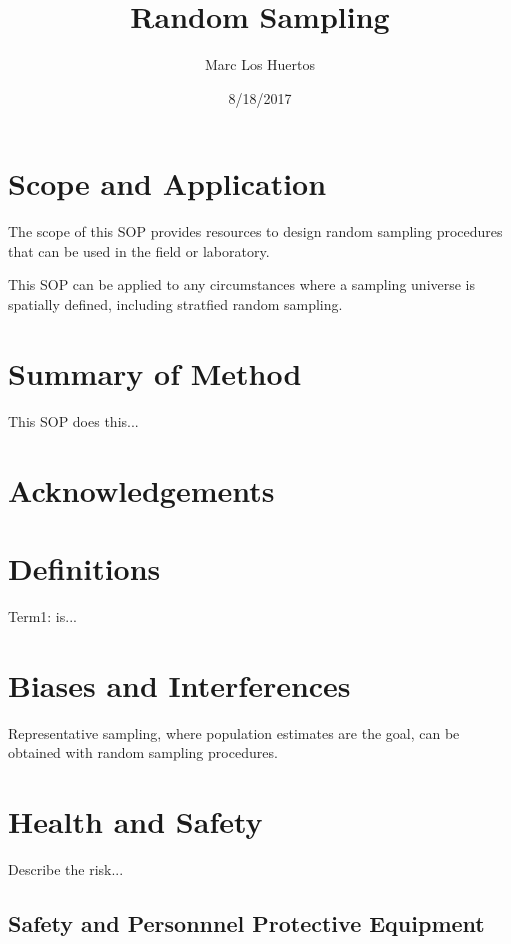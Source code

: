\documentclass[12pt]{../SOP3_beta}\usepackage[]{graphicx}\usepackage[]{color}
\title{Random Sampling}
\date{8/18/2017}
\author{Marc Los Huertos}
\begin{document}
\maketitle

\section{Scope and Application}

\NP The scope of this SOP provides resources to design random sampling procedures that can be used in the field or laboratory.  

\NP This SOP can be applied to any circumstances where a sampling universe is spatially defined, including stratfied random sampling.

\section{Summary of Method}

\NP This SOP does this...

\tableofcontents

\newpage

\section{Acknowledgements}

\section{Definitions}

\NP Term1: is...

\section{Biases and Interferences}

\NP Representative sampling, where population estimates are the goal, can be obtained with random sampling procedures. 

\section{Health and Safety}

\NP Describe the risk...


\subsection{Safety and Personnnel Protective Equipment}
\end{document}
